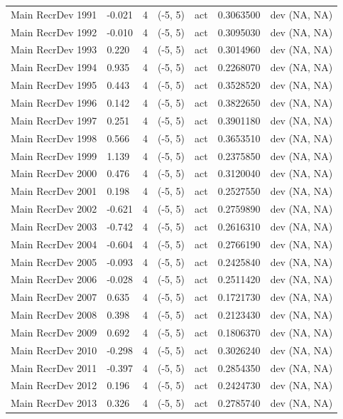 \documentclass[
  english,
  a4paper,
]{article}
\begin{document}
\begin{landscape}
\begin{longtable}[t]{>{\raggedright\arraybackslash}p{8.5cm}lllll>{\raggedright\arraybackslash}p{4cm}}
Main RecrDev 1991 & -0.021 & 4 & (-5, 5) & act & 0.3063500 & dev (NA, NA)\\
Main RecrDev 1992 & -0.010 & 4 & (-5, 5) & act & 0.3095030 & dev (NA, NA)\\
Main RecrDev 1993 & 0.220 & 4 & (-5, 5) & act & 0.3014960 & dev (NA, NA)\\
Main RecrDev 1994 & 0.935 & 4 & (-5, 5) & act & 0.2268070 & dev (NA, NA)\\
Main RecrDev 1995 & 0.443 & 4 & (-5, 5) & act & 0.3528520 & dev (NA, NA)\\
Main RecrDev 1996 & 0.142 & 4 & (-5, 5) & act & 0.3822650 & dev (NA, NA)\\
Main RecrDev 1997 & 0.251 & 4 & (-5, 5) & act & 0.3901180 & dev (NA, NA)\\
Main RecrDev 1998 & 0.566 & 4 & (-5, 5) & act & 0.3653510 & dev (NA, NA)\\
Main RecrDev 1999 & 1.139 & 4 & (-5, 5) & act & 0.2375850 & dev (NA, NA)\\
Main RecrDev 2000 & 0.476 & 4 & (-5, 5) & act & 0.3120040 & dev (NA, NA)\\
Main RecrDev 2001 & 0.198 & 4 & (-5, 5) & act & 0.2527550 & dev (NA, NA)\\
Main RecrDev 2002 & -0.621 & 4 & (-5, 5) & act & 0.2759890 & dev (NA, NA)\\
Main RecrDev 2003 & -0.742 & 4 & (-5, 5) & act & 0.2616310 & dev (NA, NA)\\
Main RecrDev 2004 & -0.604 & 4 & (-5, 5) & act & 0.2766190 & dev (NA, NA)\\
Main RecrDev 2005 & -0.093 & 4 & (-5, 5) & act & 0.2425840 & dev (NA, NA)\\
Main RecrDev 2006 & -0.028 & 4 & (-5, 5) & act & 0.2511420 & dev (NA, NA)\\
Main RecrDev 2007 & 0.635 & 4 & (-5, 5) & act & 0.1721730 & dev (NA, NA)\\
Main RecrDev 2008 & 0.398 & 4 & (-5, 5) & act & 0.2123430 & dev (NA, NA)\\
Main RecrDev 2009 & 0.692 & 4 & (-5, 5) & act & 0.1806370 & dev (NA, NA)\\
Main RecrDev 2010 & -0.298 & 4 & (-5, 5) & act & 0.3026240 & dev (NA, NA)\\
Main RecrDev 2011 & -0.397 & 4 & (-5, 5) & act & 0.2854350 & dev (NA, NA)\\
Main RecrDev 2012 & 0.196 & 4 & (-5, 5) & act & 0.2424730 & dev (NA, NA)\\
Main RecrDev 2013 & 0.326 & 4 & (-5, 5) & act & 0.2785740 & dev (NA, NA)\\

\end{longtable}
\end{landscape}
\end{document}
